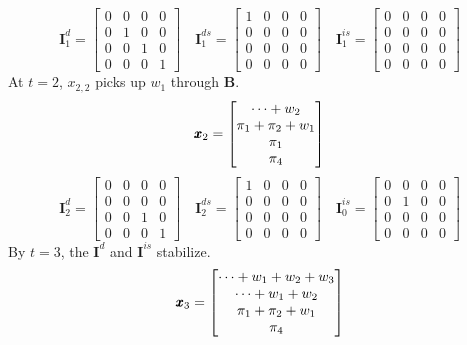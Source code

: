 \documentclass[]{article}
\def\BB{\mbox{$\mathbf B$}}	\def\bb{\mbox{$\mathbf b$}}
\def\II{\mbox{$\mathbf I$}} \def\ii{\mbox{$\mathbf i$}}
\begin{document}
\begin{equation}
\II_1^d=\begin{bmatrix}
0&0&0&0\\
0&1&0&0\\
0&0&1&0\\
0&0&0&1
\end{bmatrix}
\quad
\II_1^{ds}=\begin{bmatrix}
1&0&0&0\\
0&0&0&0\\
0&0&0&0\\
0&0&0&0
\end{bmatrix}
\quad
\II_1^{is}=\begin{bmatrix}
0&0&0&0\\
0&0&0&0\\
0&0&0&0\\
0&0&0&0
\end{bmatrix}
\end{equation}
At $t=2$, $x_{2,2}$ picks up $w_1$ through $\BB$.
\begin{equation}
\mbox{$\pmb{x}$}_2=\begin{bmatrix}
\dots+w_2\\
\pi_1+\pi_2+w_1\\
\pi_1\\
\pi_4
\end{bmatrix}
\end{equation}
\begin{equation}
\II_2^d=\begin{bmatrix}
0&0&0&0\\
0&0&0&0\\
0&0&1&0\\
0&0&0&1
\end{bmatrix}
\quad
\II_2^{ds}=\begin{bmatrix}
1&0&0&0\\
0&0&0&0\\
0&0&0&0\\
0&0&0&0
\end{bmatrix}
\quad
\II_0^{is}=\begin{bmatrix}
0&0&0&0\\
0&1&0&0\\
0&0&0&0\\
0&0&0&0
\end{bmatrix}
\end{equation}
By $t=3$, the $\II^{d}$ and $\II^{is}$ stabilize.
\begin{equation}
\mbox{$\pmb{x}$}_3=\begin{bmatrix}
\dots+w_1+w_2+w_3\\
\dots+w_1+w_2\\
\pi_1+\pi_2+w_1\\
\pi_4
\end{bmatrix}
\end{equation}
\end{document}

